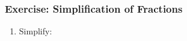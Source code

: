             \subsubsection{ Exercise: Simplification of Fractions }
            \nopagebreak
      \label{m39392*id280133}\begin{enumerate}[noitemsep, label=\textbf{\arabic*}. ] 
            \label{m39392*uid53}\item Simplify:
    \setlength\mytablespace{4\tabcolsep}
    \addtolength\mytablespace{3\arrayrulewidth}
    \setlength\mytablewidth{\linewidth}
    \setlength\mytableroom{\mytablewidth}
    \addtolength\mytableroom{-\mytablespace}
    \setlength\myfixedwidth{0pt}
    \setlength\mystarwidth{\mytableroom}
        \addtolength\mystarwidth{-\myfixedwidth}
        \divide{}
\end{enumerate}
